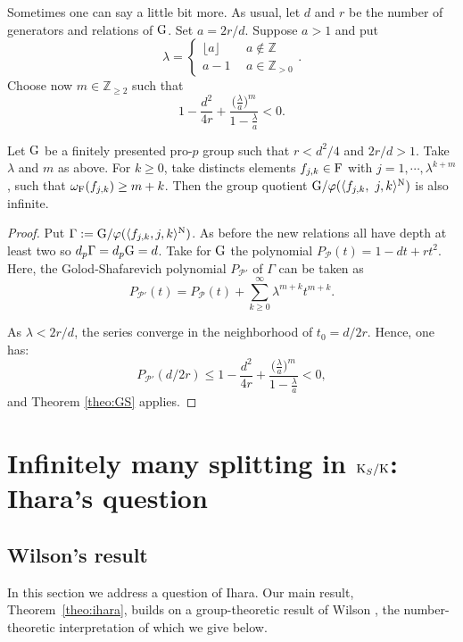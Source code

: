 \documentclass[12pt,a4paper,twoside,english]{smfart}
\def\Z{{\mathbb Z}}
\def\f{{\mathfrak f}}
\def\G{{\rm G}}
\def\K{{\rm K}}
\def\F{{\rm F}}
\def\PP{{\mathcal P}}
\begin{document}
  
Sometimes one can say a little bit more.
As usual, let $d$ and $r$ be the number of generators and relations of $\G$.
Set $a=2r/d$. Suppose $a>1$ and put $$\lambda=\left\{\begin{array}{ll} \lfloor a \rfloor  & \ \ a \notin \Z \\
 a -1 & \  \ a \in \Z_{>0} 
 \end{array}
 \right. .$$
 Choose now $m \in \Z_{\geq 2}$ such that  $$1-\frac{d^2}{4r} +  \frac{\Big(\frac{\lambda}{a}\Big)^{m}}{1-\frac{\lambda}{a}}< 0.$$

\begin{lemm} \label{prop:cutting2}
Let $\G$ be a finitely presented
 pro-$p$ group  such that $r<d^2/4$  and $2r/d>1$. Take  $\lambda$ and $m$ as above.
For $k\geq 0$, take  distincts elements $\f_{j,k} \in \F$ with $j=1,\cdots, \lambda^{k+m}$, such that $\omega_\F(\f_{j,k}) \geq m+k$. Then the group quotient $\G/\varphi(\langle \f_{j,k}, \ j,k\rangle^{\rm N})$ is also infinite.
\end{lemm}


\begin{proof} Put $\Gamma:= \G/\varphi(\langle \f_{j,k}, j,k \rangle^{\rm N})$.
As before the new relations  all have depth at least two
so $d_p \Gamma = d_p \G=d$.
 Take for $\G$ the polynomial $P_{\PP}(t)=1-dt+rt^2$. Here, the Golod-Shafarevich polynomial  $P_{\PP'}$ of $\Gamma$ can be taken as 
 $$P_{\PP'}(t)=P_{\PP}(t)+\sum_{k \geq 0}^\infty \lambda^{m+k}  t^{m+k}. $$


As $\lambda < 2r/d$,   the series converge in the neighborhood of $t_0=d/2r$.
Hence, one has: $$P_{\PP'}(d/2r) \leq 1-\frac{d^2}{4r} +  \frac{\Big(\frac{\lambda}{a}\Big)^{m}}{1-\frac{\lambda}{a}}<0,$$
 and Theorem \ref{theo:GS} applies.
\end{proof}

\color{black}






 
\section{Infinitely many splitting in $\K_S/\K$: Ihara's question }
\subsection{Wilson's result}
In this section we address a question of Ihara. Our main result,
Theorem~\ref{theo:ihara},
builds on a group-theoretic result of Wilson \cite{Wilson}, the number-theoretic interpretation of which we give below.
\end{document}
